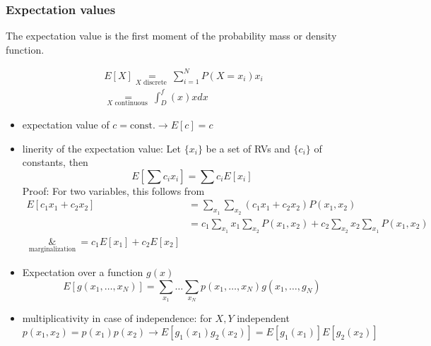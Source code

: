 \subsubsection{Expectation values}
The expectation value is the first moment of the probability mass or density
function.

\begin{equation}
    \begin{gathered}
    E[X] \underset{X \text { discrete }}{=} \sum_{i=1}^N P\left(X=x_i\right) x_i \\
    \underset{X \text { continuous }}{=} \int_D^ f(x) x d x
    \end{gathered}
\end{equation}

\begin{itemize}
    \item expectation value of $c = \text{const.} \rightarrow E[c] = c$
    \item linerity of the expectation value: Let $\{x_i\}$ be a set
    of RVs and $\{c_i\}$ of constants, then
    \begin{equation}
        E\left[\sum c_i x_i\right]=\sum c_i E\left[x_i\right]
    \end{equation}
    \textcolor{blue1}{Proof}: For two variables, this follows from
    \begin{equation}
        \begin{aligned}
        E\left[c_1 x_1+c_2 x_2\right]&=\sum_{x_1} \sum_{x_2}\left(c_1 x_1+c_2 x_2\right) P\left(x_1, x_2\right) \\
                                     &=c_1 \sum_{x_1} x_1 \sum_{x_2} P\left(x_1, x_2\right)+c_2 \sum_{x_2} x_2 \sum_{x_1} P\left(x_1, x_2\right) \\
                                    \underset{\text { marginalization }}&= c_1 E\left[x_1\right]+c_2 E\left[x_2\right]
        \end{aligned}
    \end{equation}
    \item Expectation over a function $g(x)$
    \begin{equation}
        E\left[g\left(x_1, \ldots, x_N\right)\right]=\sum_{x_1} \ldots \sum_{x_N} p\left(x_1, \ldots, x_N\right) g\left(x_1, \ldots, g_N\right)
    \end{equation}
    \item multiplicativity in case of independence: for $X,Y$ independent
    \begin{equation}
        p\left(x_1, x_2\right)=p\left(x_1\right) p\left(x_2\right) \rightarrow E\left[g_1\left(x_1\right) g_2\left(x_2\right)\right]=E\left[g_1\left(x_1\right)\right] E\left[g_2\left(x_2\right)\right]
    \end{equation}
\end{itemize}

